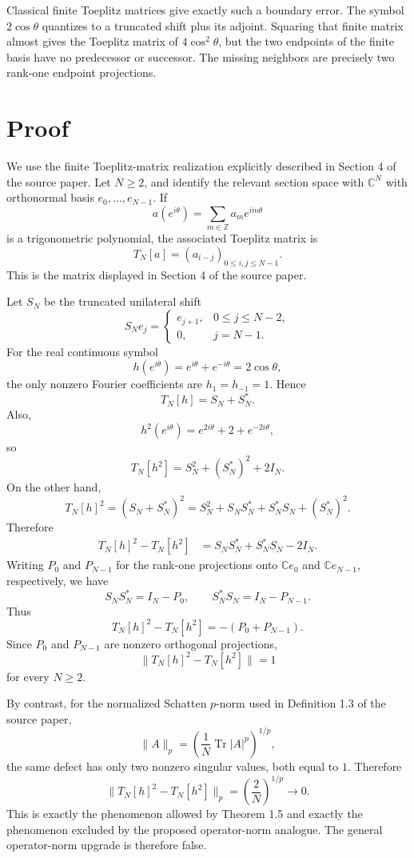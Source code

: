\documentclass[11pt]{article}
\DeclareMathOperator{\Tr}{Tr}
\begin{document}
Classical finite Toeplitz matrices give exactly such a boundary error. The
symbol \(2\cos\theta\) quantizes to a truncated shift plus its adjoint. Squaring
that finite matrix almost gives the Toeplitz matrix of \(4\cos^2\theta\), but
the two endpoints of the finite basis have no predecessor or successor. The
missing neighbors are precisely two rank-one endpoint projections.

\section*{Proof}

We use the finite Toeplitz-matrix realization explicitly described in Section 4
of the source paper. Let \(N\geq 2\), and identify the relevant section space
with \(\mathbb C^N\) with orthonormal basis \(e_0,\ldots,e_{N-1}\). If
\[
   a(e^{i\theta})=\sum_{m\in\mathbb Z} a_m e^{im\theta}
\]
is a trigonometric polynomial, the associated Toeplitz matrix is
\[
   T_N[a]=(a_{i-j})_{0\leq i,j\leq N-1}.
\]
This is the matrix displayed in Section 4 of the source paper.

Let \(S_N\) be the truncated unilateral shift
\[
   S_Ne_j=
   \begin{cases}
      e_{j+1}, & 0\leq j\leq N-2,\\
      0, & j=N-1.
   \end{cases}
\]
For the real continuous symbol
\[
   h(e^{i\theta})=e^{i\theta}+e^{-i\theta}=2\cos\theta,
\]
the only nonzero Fourier coefficients are \(h_1=h_{-1}=1\). Hence
\[
   T_N[h]=S_N+S_N^*.
\]
Also,
\[
   h^2(e^{i\theta})
   =e^{2i\theta}+2+e^{-2i\theta},
\]
so
\[
   T_N[h^2]=S_N^2+(S_N^*)^2+2I_N.
\]
On the other hand,
\[
   T_N[h]^2
   =(S_N+S_N^*)^2
   =S_N^2+S_NS_N^*+S_N^*S_N+(S_N^*)^2.
\]
Therefore
\[
\begin{aligned}
   T_N[h]^2-T_N[h^2]
   &=S_NS_N^*+S_N^*S_N-2I_N .
\end{aligned}
\]
Writing \(P_0\) and \(P_{N-1}\) for the rank-one projections onto
\(\mathbb C e_0\) and \(\mathbb C e_{N-1}\), respectively, we have
\[
   S_NS_N^*=I_N-P_0,\qquad S_N^*S_N=I_N-P_{N-1}.
\]
Thus
\[
   T_N[h]^2-T_N[h^2]=-(P_0+P_{N-1}).
\]
Since \(P_0\) and \(P_{N-1}\) are nonzero orthogonal projections,
\[
   \|T_N[h]^2-T_N[h^2]\|=1
\]
for every \(N\geq 2\).

By contrast, for the normalized Schatten \(p\)-norm used in Definition 1.3 of
the source paper,
\[
   \|A\|_p=\left(\frac1N\Tr |A|^p\right)^{1/p},
\]
the same defect has only two nonzero singular values, both equal to \(1\).
Therefore
\[
   \|T_N[h]^2-T_N[h^2]\|_p=\left(\frac{2}{N}\right)^{1/p}\to 0.
\]
This is exactly the phenomenon allowed by Theorem 1.5 and exactly the
phenomenon excluded by the proposed operator-norm analogue. The general
operator-norm upgrade is therefore false.
\end{document}
